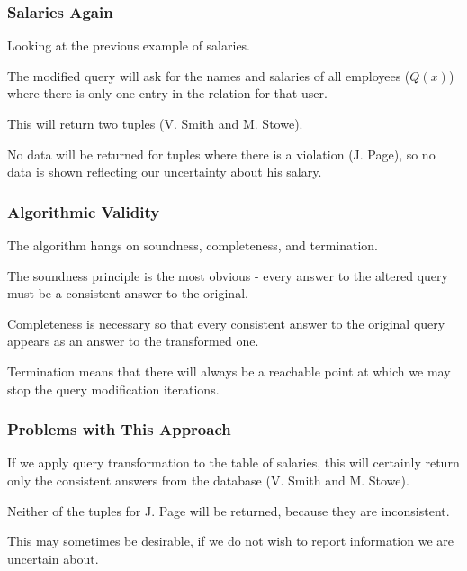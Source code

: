 \begin{frame}
\frametitle{Salaries Again}

Looking at the previous example of salaries.

The modified query will ask for the names and salaries of all employees ($Q(x)$) where there is only one entry in the relation for that user.

This will return two tuples (V. Smith and M. Stowe). 

No data will be returned for tuples where there is a violation (J. Page), so no data is shown reflecting our uncertainty about his salary.


\end{frame}

\begin{frame}
\frametitle{Algorithmic Validity}

The algorithm hangs on soundness, completeness, and termination.

The soundness principle is the most obvious - every answer to the altered query must be a consistent answer to the original.

Completeness is necessary so that every consistent answer to the original query appears as an answer to the transformed one. 

Termination means that there will always be a reachable point at which we may stop the query modification iterations.

\end{frame}



\begin{frame}
\frametitle{Problems with This Approach}

If we apply query transformation to the table of salaries, this will certainly return only the consistent answers from the database (V. Smith and M. Stowe). 

Neither of the tuples for J. Page will be returned, because they are inconsistent. 

This may sometimes be desirable, if we do not wish to report information we are uncertain about. 

\end{frame}



